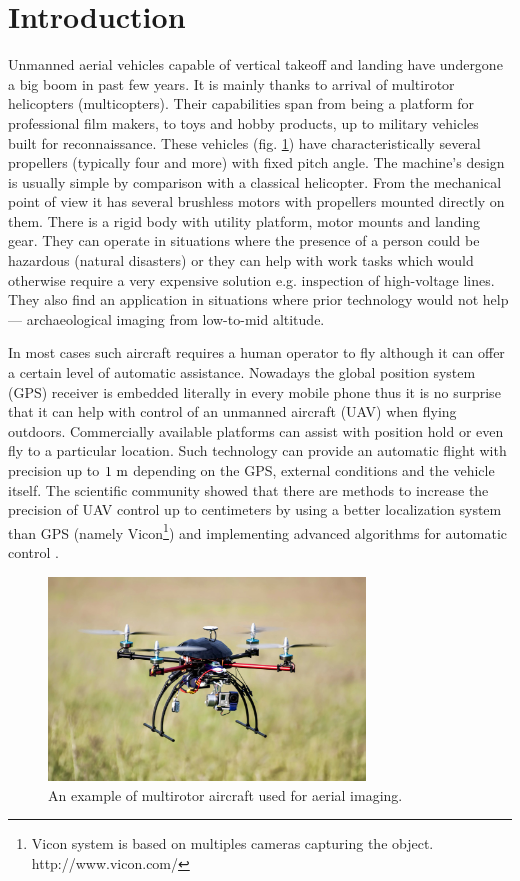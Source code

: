 \section{Introduction}

Unmanned aerial vehicles capable of vertical takeoff and landing have undergone a big boom in past few years. It is mainly thanks to arrival of multirotor helicopters (multicopters). Their capabilities span from being a platform for professional film makers, to toys and hobby products, up to military vehicles built for reconnaissance. These vehicles (fig. \ref{fig:quadru1}) have characteristically several propellers (typically four and more) with fixed pitch angle. The machine's design is usually simple by comparison with a classical helicopter. From the mechanical point of view it has several brushless motors with propellers mounted directly on them. There is a rigid body with utility platform, motor mounts and landing gear. They can operate in situations where the presence of a person could be hazardous (natural disasters) or they can help with work tasks which would otherwise require a very expensive solution e.g. inspection of high-voltage lines. They also find an application in situations where prior technology would not help --- archaeological imaging from low-to-mid altitude.

In most cases such aircraft requires a human operator to fly although it can offer a certain level of automatic assistance. Nowadays the global position system (GPS) receiver is embedded literally in every mobile phone thus it is no surprise that it can help with control of an unmanned aircraft (UAV) when flying outdoors. Commercially available platforms can assist with position hold or even fly to a particular location. Such technology can provide an automatic flight with precision up to $1 ~\mathrm{m}$ depending on the GPS, external conditions and the vehicle itself. The scientific community showed that there are methods to increase the precision of UAV control up to centimeters by using a better localization system than GPS (namely Vicon\footnote{Vicon system is based on multiples cameras capturing the object. http://www.vicon.com/}) and implementing advanced algorithms for automatic control \citep{brescianini2013polearobatics, kumar2010grasp}.

\begin{figure}[h]
\centering
\includegraphics[width=0.75\textwidth]{fig/quadru1.jpg}
\caption{An example of multirotor aircraft used for aerial imaging.}
\label{fig:quadru1}
\end{figure}

